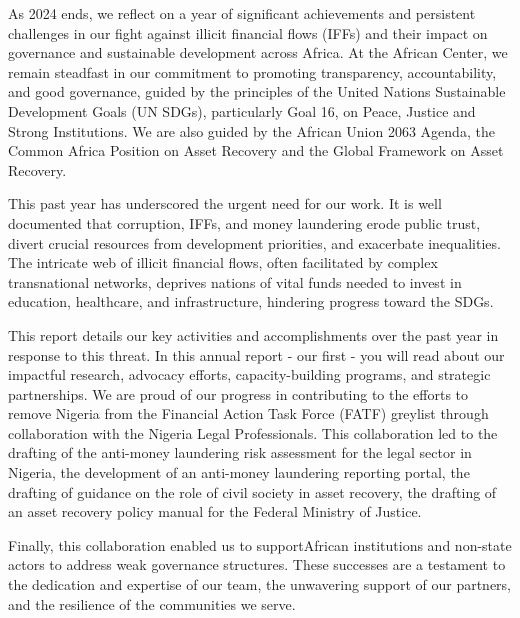 \documentclass[
  letterpaper,
  DIV=11,
  numbers=noendperiod]{scrreprt}
\begin{document}
As 2024 ends, we reflect on a year of significant achievements and
persistent challenges in our fight against illicit financial flows
(IFFs) and their impact on governance and sustainable development across
Africa. At the African Center, we remain steadfast in our commitment to
promoting transparency, accountability, and good governance, guided by
the principles of the United Nations Sustainable Development Goals (UN
SDGs), particularly Goal 16, on Peace, Justice and Strong Institutions.
We are also guided by the African Union 2063 Agenda, the Common Africa
Position on Asset Recovery and the Global Framework on Asset Recovery.

This past year has underscored the urgent need for our work. It is well
documented that corruption, IFFs, and money laundering erode public
trust, divert crucial resources from development priorities, and
exacerbate inequalities. The intricate web of illicit financial flows,
often facilitated by complex transnational networks, deprives nations of
vital funds needed to invest in education, healthcare, and
infrastructure, hindering progress toward the SDGs.

This report details our key activities and accomplishments over the past
year in response to this threat. In this annual report - our first - you
will read about our impactful research, advocacy efforts,
capacity-building programs, and strategic partnerships. We are proud of
our progress in contributing to the efforts to remove Nigeria from the
Financial Action Task Force (FATF) greylist through collaboration with
the Nigeria Legal Professionals. This collaboration led to the drafting
of the anti-money laundering risk assessment for the legal sector in
Nigeria, the development of an anti-money laundering reporting portal,
the drafting of guidance on the role of civil society in asset recovery,
the drafting of an asset recovery policy manual for the Federal Ministry
of Justice.

Finally, this collaboration enabled us to supportAfrican institutions
and non-state actors to address weak governance structures. These
successes are a testament to the dedication and expertise of our team,
the unwavering support of our partners, and the resilience of the
communities we serve.
\end{document}
